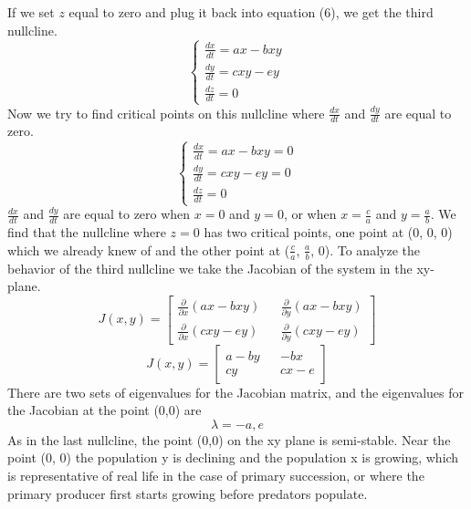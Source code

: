 \documentclass[11pt,oneside]{article}
\begin{document}
	If we set $z$ equal to zero and plug it back into equation (6), we get the third nullcline.
	\begin{equation}
	\begin{cases}
	\frac{dx}{dt} = ax - bxy\\
	\frac{dy}{dt} = cxy - ey\\
	\frac{dz}{dt} = 0
	\end{cases}
	\end{equation}
	Now we try to find critical points on this nullcline where $\frac{dx}{dt}$ and $\frac{dy}{dt}$ are equal to zero.
	\begin{equation}
	\begin{cases}
	\frac{dx}{dt} = ax - bxy = 0\\
	\frac{dy}{dt} = cxy - ey = 0\\
	\frac{dz}{dt} = 0
	\end{cases}
	\end{equation}
	$\frac{dx}{dt}$ and $\frac{dy}{dt}$ are equal to zero when $x = 0$ and $y = 0$, or when $x = \frac{c}{a}$ and $y = \frac{a}{b}$. We find that the nullcline where $z = 0$ has two critical points, one point at (0, 0, 0) which we already knew of and the other point at ($\frac{c}{a}$, $\frac{a}{b}$, 0).
	To analyze the behavior of the third nullcline we take the Jacobian of the system in the xy-plane.
	\begin{equation}
	J(x,y) = 
	\begin{bmatrix}
	\frac{\partial}{\partial x}(ax - bxy) && \frac{\partial}{\partial y}(ax - bxy) \\
	\frac{\partial}{\partial x}(cxy - ey) && \frac{\partial}{\partial y}(cxy - ey)
	\end{bmatrix}
	\end{equation}	
	\begin{equation}
	J(x,y) = 
	\begin{bmatrix}
	a - by && -bx \\
	cy && cx - e
	\end{bmatrix}
	\end{equation}
	There are two sets of eigenvalues for the Jacobian matrix, and the eigenvalues for the Jacobian at the point (0,0) are 
	\[\lambda = -a, e\]
	As in the last nullcline, the point (0,0) on the xy plane is semi-stable. Near the point (0, 0) the population y is declining and the population x is growing, which is representative of real life in the case of primary succession, or where the primary producer first starts growing before predators populate.
	
\end{document}
